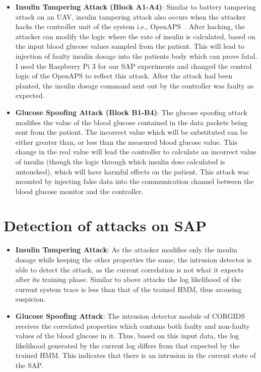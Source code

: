 \begin{itemize}
\item {\bf Insulin Tampering Attack (Block A1-A4)}: Similar to battery tampering attack on an \ac{UAV}, insulin tampering attack also occurs when the attacker hacks the controller unit of the system i.e., \ac{OpenAPS}~\cite{radcliffe2011hacking}. After hacking, the attacker can modify the logic where the rate of insulin is calculated, based on the input blood glucose values sampled from the patient. This will lead to injection of faulty insulin dosage into the patients body which can prove fatal. I used the Raspberry Pi 3 for our \ac{SAP} experiments and changed the control logic of the \ac{OpenAPS} to reflect this attack. After the attack had been planted, the insulin dosage command sent out by the controller was faulty as expected.

\item {\bf Glucose Spoofing Attack (Block B1-B4)}: The glucose spoofing attack modifies the value of the blood glucose contained in the data packets being sent from the patient. The incorrect value which will be substituted can be either greater than, or less than the measured blood glucose value. This change in the real value will lead the controller to calculate an incorrect value of insulin (though the logic through which insulin dose calculated is untouched), which will have harmful effects on the patient. This attack was mounted by injecting false data into the communication channel between the blood glucose monitor and the controller.
\end{itemize}

\section{Detection of attacks on \ac{SAP}}
\begin{itemize}
\item {\bf Insulin Tampering Attack}: As the attacker modifies only the insulin dosage while keeping the other properties the same, the intrusion detector is able to detect the attack, as the current correlation is not what it expects after its training phase. Similar to above attacks the log likelihood of the current system trace is less than that of the trained \ac{HMM}, thus arousing suspicion.
\item {\bf Glucose Spoofing Attack}:  The intrusion detector module of \ac{CORGIDS} receives the correlated properties which contains both faulty and non-faulty values of the blood glucose in it. Thus, based on this input data, the log likelihood generated by the current log differs from that expected by the trained \ac{HMM}. This indicates that there is an intrusion in the current state of the \ac{SAP}.
\end{itemize}

